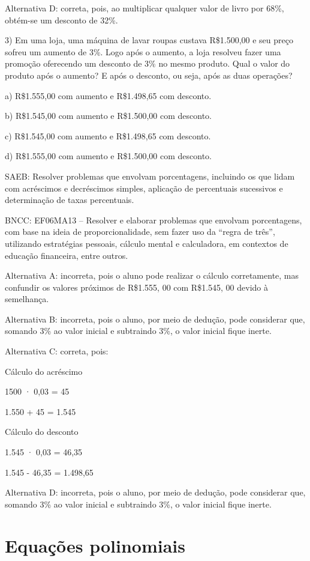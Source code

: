 Alternativa D: correta, pois, ao multiplicar qualquer valor de livro por
68\%, obtém-se um desconto de 32\%.

3) Em uma loja, uma máquina de lavar roupas custava R\$1.500,00 e seu
preço sofreu um aumento de 3\%. Logo após o aumento, a loja resolveu
fazer uma promoção oferecendo um desconto de 3\% no mesmo produto. Qual
o valor do produto após o aumento? E após o desconto, ou seja, após as
duas operações?

a) R\$1.555,00 com aumento e R\$1.498,65 com desconto.

b) R\$1.545,00 com aumento e R\$1.500,00 com desconto.

c) R\$1.545,00 com aumento e R\$1.498,65 com desconto.

d) R\$1.555,00 com aumento e R\$1.500,00 com desconto.

SAEB: Resolver problemas que envolvam porcentagens, incluindo os que
lidam com acréscimos e decréscimos simples, aplicação de percentuais
sucessivos e determinação de taxas percentuais.

BNCC: EF06MA13 -- Resolver e elaborar problemas que envolvam
porcentagens, com base na ideia de proporcionalidade, sem fazer uso da
``regra de três'', utilizando estratégias pessoais, cálculo mental e
calculadora, em contextos de educação financeira, entre outros.

Alternativa A: incorreta, pois o aluno pode realizar o cálculo
corretamente, mas confundir os valores próximos de R\$1.555, 00 com
R\$1.545, 00 devido à semelhança.

Alternativa B: incorreta, pois o aluno, por meio de dedução, pode
considerar que, somando 3\% ao valor inicial e subtraindo 3\%, o valor
inicial fique inerte.

Alternativa C: correta, pois:

Cálculo do acréscimo

1500 · 0,03 = 45

1.550 + 45 = 1.545

Cálculo do desconto

1.545 · 0,03 = 46,35

1.545 - 46,35 = 1.498,65

Alternativa D: incorreta, pois o aluno, por meio de dedução, pode
considerar que, somando 3\% ao valor inicial e subtraindo 3\%, o valor
inicial fique inerte.

\chapter{Equações polinomiais}

